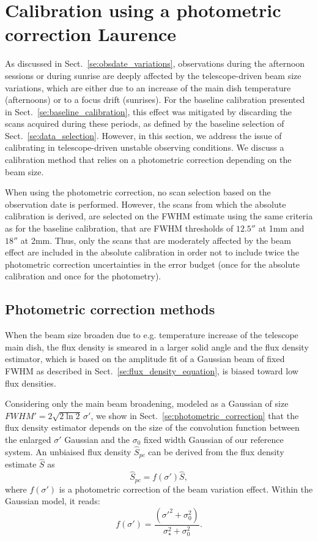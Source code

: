 \section{Calibration using a photometric correction {\color{YellowGreen} Laurence} }
\label{se:photocorr_calibration}

As discussed in Sect.~\ref{se:obsdate_variations}, observations during the
afternoon sessions or
during sunrise
are deeply affected by the telescope-driven beam
size variations, which are either due to an increase of the main dish
temperature (afternoons) or to a focus drift (sunrises).
For the baseline calibration presented in
Sect.~\ref{se:baseline_calibration}, this effect was mitigated by
discarding the scans acquired during these periods, as defined by the
baseline selection of Sect.~\ref{se:data_selection}. However, in
this section, we address the issue of calibrating in
telescope-driven unstable observing conditions. We discuss a
calibration method that relies on a photometric correction
depending on the beam size. 

When using the photometric correction, no scan selection based on the
observation date is performed. However, the scans from which the
absolute calibration is derived, are selected on the FWHM estimate
using the same criteria as for the baseline calibration, that are FWHM
thresholds of $12.5''$ at 1mm and $18''$ at 2mm.  Thus, only
the scans that are moderately affected by the beam effect are included
in the absolute calibration in order not to include twice the
photometric correction uncertainties in the error budget (once for the
absolute calibration and once for the photometry).


\subsection{Photometric correction methods}
\label{se:photocorr_methods}

When the beam size broaden due to e.g. temperature increase of the
telescope main dish, the flux density is smeared in a larger solid angle and
the flux density estimator, which is based on the amplitude fit of a
Gaussian beam of fixed FWHM as described in
Sect.~\ref{se:flux_density_equation}, is biased toward low flux densities.

Considering only the main beam broadening, modeled as a Gaussian of
size $FWHM' = 2 \sqrt{2\ln{2}} \, \sigma '$, we show in
Sect.~\ref{se:photometric_correction} that
the flux density estimator depends on the size of the convolution
function between the enlarged $\sigma '$ Gaussian and the 
$\sigma_0$ fixed width Gaussian of our reference system. An unbiaised
flux density $\hat{S}_{pc}$ can be derived from the flux density
estimate $\hat{S}$ as
\begin{equation}
  \hat{S}_{pc} = f(\sigma')\hat{S},
\end{equation}
where $f(\sigma')$ is a photometric correction of the beam variation
effect. Within the Gaussian model, it reads:
\begin{equation}
  f(\sigma') = \frac{(\sigma'^2 + \sigma_0^2)}{\sigma_{\star}^2 + \sigma_0^2}. 
\end{equation} 

